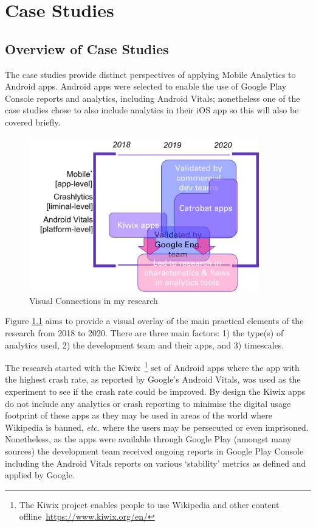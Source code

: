 \chapter{Case Studies}
\section{Overview of Case Studies}
The case studies provide %
distinct perspectives of applying Mobile Analytics to Android apps. Android apps were selected to enable the use of Google Play Console reports and analytics, including Android Vitals; nonetheless one of the case studies chose to also include analytics in their iOS app so this will also be covered briefly.

\begin{figure}[ht]
    \centering
    \includegraphics[width=10cm]{images/visual-connections-in-research.png}
    \caption{Visual Connections in my research}
    \label{fig:visual-connections-in-research}
\end{figure}

Figure \ref{fig:visual-connections-in-research}  aims to provide a visual overlay of the main practical elements of the research from 2018 to 2020. There are three main factors: 1) the type(s) of analytics used, 2) the development team and their apps, and 3) timescales.

The research started with the Kiwix~\footnote{The Kiwix project enables people to use Wikipedia and other content offline~\url{https://www.kiwix.org/en/}} set of Android apps where the app with the highest crash rate, as reported by Google's Android Vitals, was used as the experiment to see if the crash rate could be improved. By design the Kiwix apps do not include any analytics or crash reporting to minimise the digital usage footprint of these apps as they may be used in areas of the world where Wikipedia is banned, \emph{etc.} where the users may be persecuted or even imprisoned. Nonetheless, as the apps were available through Google Play (amongst many sources) the development team received ongoing reports in Google Play Console including the Android Vitals reports on various `stability' metrics as defined and applied by Google.

